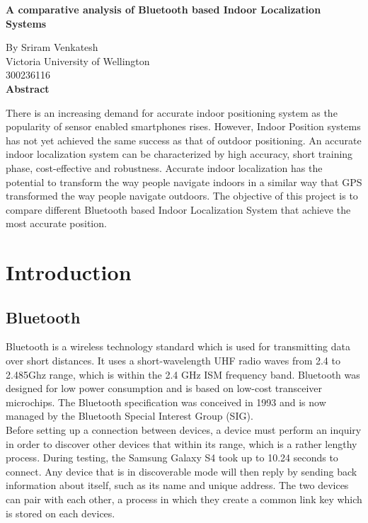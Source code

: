 \documentclass[12pt]{article}
\begin{document}
\begin{titlepage}
\begin{center}
	\Huge
	\textbf{A comparative analysis of Bluetooth based Indoor Localization Systems} \\
	\large    

	\vspace{0.5cm}
	By Sriram Venkatesh\\
	Victoria University of Wellington\\
	300236116 \\

	\vspace{0.9cm}
	\textbf{Abstract}
\end{center}
\doublespacing
	There is an increasing demand for accurate indoor positioning system as the popularity of sensor enabled smartphones rises. However, Indoor Position systems has not yet achieved the same success as that of outdoor positioning. An accurate indoor localization system can be characterized by high accuracy, short training phase, cost-effective and robustness. Accurate indoor localization has the potential to transform the way people navigate indoors in a similar way that GPS transformed the way people navigate outdoors. The objective of this project is to compare different Bluetooth based Indoor Localization System that achieve the most accurate position. 


\end{titlepage}

\doublespacing
\section{Introduction}

\subsection{Bluetooth}
Bluetooth is a wireless technology standard which is used for transmitting data over short distances. It uses a short-wavelength UHF radio waves from 2.4 to 2.485Ghz range, which is within the 2.4 GHz ISM frequency band. Bluetooth was designed for low power consumption and is based on low-cost transceiver microchips. The Bluetooth specification was conceived in 1993 and is now managed by the Bluetooth Special Interest Group (SIG). \\

Before setting up a connection between devices, a device must perform an inquiry in order to discover other devices that within its range, which is a rather lengthy process. During testing, the Samsung Galaxy S4 took up to 10.24 seconds to connect. Any device that is in discoverable mode will then reply by sending back information about itself, such as its name and unique address. The two devices can pair with each other, a process in which they create a common link key which is stored on each devices. \\
\end{document}
